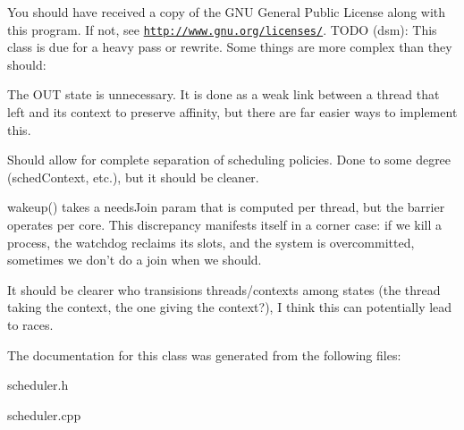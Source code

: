 You should have received a copy of the G\-N\-U General Public License along with this program. If not, see \href{http://www.gnu.org/licenses/}{\tt http\-://www.\-gnu.\-org/licenses/}. T\-O\-D\-O (dsm)\-: This class is due for a heavy pass or rewrite. Some things are more complex than they should\-:
\begin{DoxyItemize}
\item The O\-U\-T state is unnecessary. It is done as a weak link between a thread that left and its context to preserve affinity, but there are far easier ways to implement this.
\item Should allow for complete separation of scheduling policies. Done to some degree (sched\-Context, etc.), but it should be cleaner.
\item wakeup() takes a needs\-Join param that is computed per thread, but the barrier operates per core. This discrepancy manifests itself in a corner case\-: if we kill a process, the watchdog reclaims its slots, and the system is overcommitted, sometimes we don't do a join when we should.
\item It should be clearer who transisions threads/contexts among states (the thread taking the context, the one giving the context?), I think this can potentially lead to races. 
\end{DoxyItemize}

The documentation for this class was generated from the following files\-:\begin{DoxyCompactItemize}
\item 
scheduler.\-h\item 
scheduler.\-cpp\end{DoxyCompactItemize}
